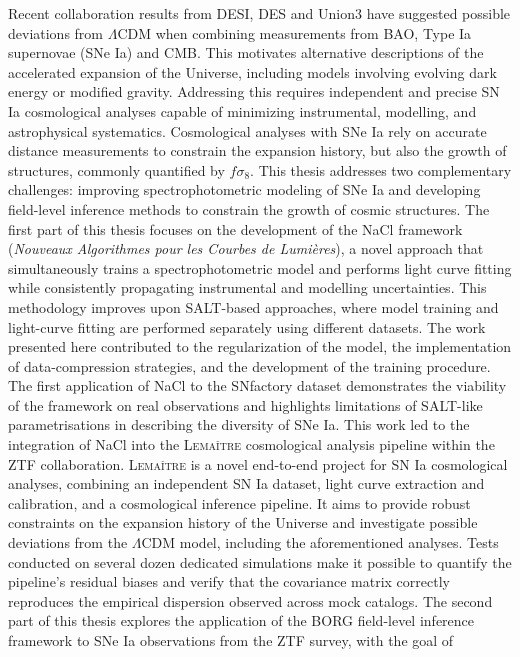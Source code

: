 Recent collaboration results from DESI, DES and Union3 have suggested possible deviations from $\Lambda$CDM when combining measurements from BAO, Type Ia supernovae (SNe Ia) and CMB. 
This motivates alternative descriptions of the accelerated expansion of the Universe, including models involving evolving dark energy or modified gravity. Addressing this 
requires independent and precise SN Ia cosmological analyses capable of minimizing instrumental, modelling, and astrophysical systematics. Cosmological analyses with SNe Ia 
rely on accurate distance measurements to constrain the expansion history, but also the growth of structures, commonly quantified by $f\sigma_8$. This thesis addresses two 
complementary challenges: improving spectrophotometric modeling of SNe Ia and developing field-level inference methods to constrain the growth of cosmic structures. The first 
part of this thesis focuses on the development of the NaCl framework (\textit{Nouveaux Algorithmes pour les Courbes de Lumières}), a novel approach that simultaneously trains a 
spectrophotometric model and performs light curve fitting while consistently propagating instrumental and modelling uncertainties. This methodology improves upon SALT-based 
approaches, where model training and light-curve fitting are performed separately using different datasets. The work presented here contributed to the regularization of the 
model, the implementation of data-compression strategies, and the development of the training procedure. The first application of NaCl to the SNfactory dataset demonstrates 
the viability of the framework on real observations and highlights limitations of SALT-like parametrisations in describing the diversity of SNe Ia. This work led to the 
integration of NaCl into the \textsc{Lemaître} cosmological analysis pipeline within the ZTF collaboration. \textsc{Lemaître} is a novel end-to-end project for SN Ia cosmological analyses, 
combining an independent SN Ia dataset, light curve extraction and calibration, and a cosmological inference pipeline. It aims to provide robust constraints on the expansion 
history of the Universe and investigate possible deviations from the $\Lambda$CDM model, including the aforementioned analyses. Tests conducted on several dozen dedicated simulations 
make it possible to quantify the pipeline's residual biases and verify that the covariance matrix correctly reproduces the empirical dispersion observed across mock catalogs.  
The second part of this thesis explores the application of the BORG field-level inference framework to SNe Ia observations from the ZTF survey, with the goal of 
